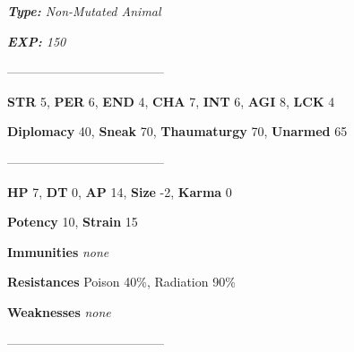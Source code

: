 \documentclass[11pt,a4paper,twocolumn]{book}
\begin{document}
	\noindent
	\emph{\textbf{Type:} Non-Mutated Animal}
	
	\noindent
	\emph{\textbf{EXP:} 150}
	
%		
%	
%		

	--------------------------------------

	\noindent
	\textbf{STR} 5, \textbf{PER} 6, \textbf{END} 4, \textbf{CHA} 7, \textbf{INT} 6, \textbf{AGI} 8, \textbf{LCK} 4
	
	\noindent
	\textbf{Diplomacy} 40, \textbf{Sneak} 70, \textbf{Thaumaturgy} 70, \textbf{Unarmed} 65
	
	--------------------------------------
	
	\noindent
	\textbf{HP} 7, \textbf{DT} 0, \textbf{AP} 14, \textbf{Size} -2, \textbf{Karma} 0
	
	\noindent
	\textbf{Potency} 10, \textbf{Strain} 15
	
	\noindent
	\textbf{Immunities} \emph{none} %
	
	\noindent
	\textbf{Resistances} Poison 40\%, Radiation 90\%%
	
	\noindent
	\textbf{Weaknesses} \emph{none}%
	
	--------------------------------------
	
\end{document}
